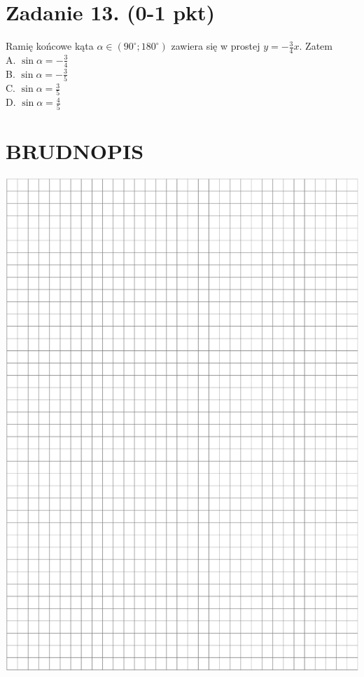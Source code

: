 \documentclass[10pt]{article}
\begin{document}
\section*{Zadanie 13. (0-1 pkt)}
Ramię końcowe kąta \(\alpha \in\left(90^{\circ} ; 180^{\circ}\right)\) zawiera się w prostej \(y=-\frac{3}{4} x\). Zatem\\
A. \(\sin \alpha=-\frac{3}{4}\)\\
B. \(\sin \alpha=-\frac{3}{5}\)\\
C. \(\sin \alpha=\frac{3}{5}\)\\
D. \(\sin \alpha=\frac{4}{5}\)

\section*{BRUDNOPIS}
\begin{center}
\includegraphics[max width=\textwidth]{2024_11_21_832f1bc2b626663f1df2g-05}
\end{center}
\end{document}
